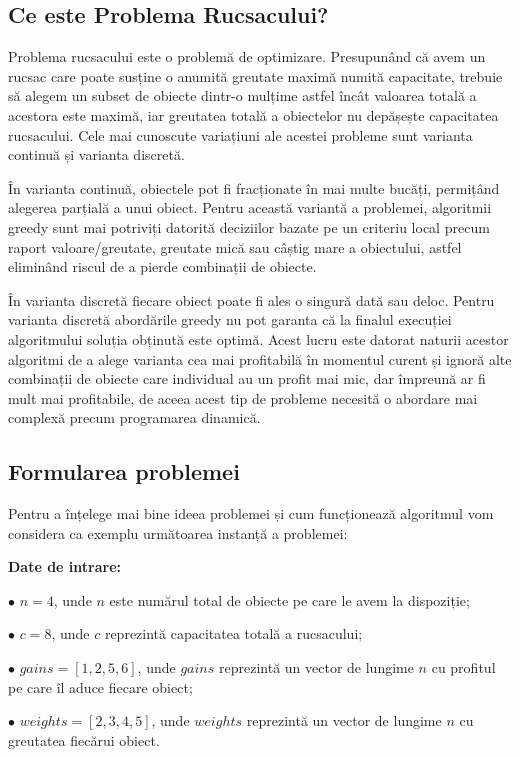 \begin{sloppypar}
\subsection*{Ce este Problema Rucsacului?}
Problema rucsacului este o problemă de optimizare. Presupunând că avem un rucsac care poate susține o anumită greutate maximă numită capacitate, trebuie să alegem un subset de obiecte dintr-o mulțime astfel încât valoarea totală a acestora este maximă, iar greutatea totală a obiectelor nu depășește capacitatea rucsacului. Cele mai cunoscute variațiuni ale acestei probleme sunt varianta continuă și varianta discretă. \par 
În varianta continuă, obiectele pot fi fracționate în mai multe bucăți, permițând alegerea parțială a unui obiect. Pentru această variantă a problemei, algoritmii greedy sunt mai potriviți datorită deciziilor bazate pe un criteriu local precum raport valoare/greutate, greutate mică sau câștig mare a obiectului, astfel eliminând riscul de a pierde combinații de obiecte. \par
În varianta discretă fiecare obiect poate fi ales o singură dată sau deloc. Pentru varianta discretă abordările greedy nu pot garanta că la finalul execuției algoritmului soluția obținută este optimă. \cite{Algorithm-Design} Acest lucru este datorat naturii acestor algoritmi de a alege varianta cea mai profitabilă în momentul curent și ignoră alte combinații de obiecte care individual au un profit mai mic, dar împreună ar fi mult mai profitabile, de aceea acest tip de probleme necesită o abordare mai complexă precum programarea dinamică. \\

\subsection*{Formularea problemei}
Pentru a înțelege mai bine ideea problemei și cum funcționează algoritmul vom considera ca exemplu următoarea instanță a problemei:
\begin{textbox}
\textbf{Date de intrare:} \par
$\bullet$ $n = 4$, unde $n$ este numărul total de obiecte pe care le avem la dispoziție; \par
$\bullet$ $c = 8$, unde $c$ reprezintă capacitatea totală a rucsacului; \par
$\bullet$ $gains = [1, 2, 5, 6]$, unde $gains$ reprezintă un vector de lungime $n$ cu profitul pe care îl aduce fiecare obiect; \par
$\bullet$ $weights = [2, 3, 4, 5]$, unde $weights$ reprezintă un vector de lungime $n$ cu greutatea fiecărui obiect.
\end{textbox}


\end{sloppypar}
